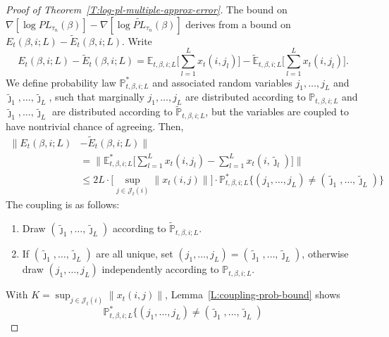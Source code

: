 \documentclass[aoas,preprint]{imsart}
\begin{document}
\begin{proof}[Proof of Theorem~\ref{T:log-pl-multiple-approx-error}]
The bound on 
\(
    \nabla [\log \mathit{PL}_{\tau_n}(\beta) ]
    -
    \nabla [\log \widetilde{\mathit{PL}}_{\tau_n}(\beta) ]
\)
derives from a bound on
\(
    E_t(\beta,i;L)
    -
    \widetilde E_t(\beta,i;L).
\)
Write
\[
    E_{t}(\beta, i; L) - \widetilde{E}_t(\beta, i; L)
        =
        \mathbb{E}_{t,\beta,i;L}
            \Big[ \sum_{l=1}^L x_t(i,j_l) \Big]
        -
        \widetilde{\mathbb{E}}_{t,\beta,i;L}
            \Big[ \sum_{l=1}^L x_t(i,j_l) \Big].
\]
We define probability law $\mathbb{P}^\ast_{t,\beta,i;L}$ and 
associated random variables $j_1, \ldots, j_L$ and
$\tilde \jmath_1, \ldots, \tilde \jmath_L$, such that marginally
$j_1, \ldots, j_L$ are distributed according to $\mathbb{P}_{t,\beta,i;L}$
and $\tilde \jmath_1, \ldots, \tilde \jmath_L$ are distributed according
to $\tilde{\mathbb{P}}_{t,\beta,i;L}$, but the variables are coupled to have
nontrivial chance of agreeing.  Then,
\begin{align*}
    \Big\| E_{t}(\beta, i; L) &- \widetilde{E}_t(\beta, i; L) \Big\| \\
        &=
            \Big\|
            \mathbb{E}_{t,\beta,i;L}^\ast
            \Big[
                \sum_{l=1}^L x_t(i,j_l)
                -
                \sum_{l=1}^L x_t(i, \tilde \jmath_l)
            \Big]
            \Big\| \\
        &\leq
            2 L
            \cdot
            \Big[
                \sup_{j \in \mathcal{J}_t(i)}
                \| x_t(i,j) \|
            \Big]
            \cdot
            \mathbb{P}^\ast_{t,\beta,i;L}
            \Big\{
                (j_1, \ldots, j_L)
                    \neq
                    (\tilde \jmath_1, \ldots, \tilde \jmath_L)
            \Big\}
\end{align*}
The coupling is as follows:
\begin{enumerate}
    \item Draw $(\tilde \jmath_1, \ldots, \tilde \jmath_L)$ according to
        $\tilde{\mathbb{P}}_{t,\beta,i;L}$.
    \item If $(\tilde \jmath_1, \ldots, \tilde \jmath_L)$ are all unique,
        set $(j_1, \ldots, j_L) = (\tilde \jmath_1, \ldots, \tilde \jmath_L)$,
        otherwise draw $(j_1, \ldots, j_L)$ independently according to
        $\mathbb{P}_{t,\beta,i;L}$.
\end{enumerate}
With $K = \sup_{j \in \mathcal{J}_t(i)} \| x_t(i,j) \|$, 
Lemma~\ref{L:coupling-prob-bound} shows
\[
    \mathbb{P}^\ast_{t,\beta,i;L}
    \Big\{
        (j_1, \ldots, j_L)
            \neq
            (\tilde \jmath_1, \ldots, \tilde \jmath_L)
\]
\end{proof}
\end{document}
